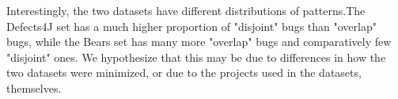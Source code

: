 
Interestingly, the two datasets have different distributions of patterns.The Defects4J set has a much higher proportion of "disjoint" bugs than "overlap" bugs, while the Bears set has many more "overlap" bugs and comparatively few "disjoint" ones. We hypothesize that this may be due to differences in how the two datasets were minimized, or due to the projects used in the datasets, themselves. 


